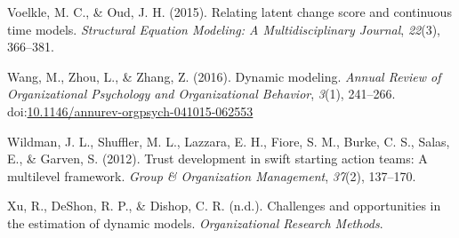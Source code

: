 \documentclass[english,,man]{apa6}
\theoremstyle{definition}
\theoremstyle{definition}
\theoremstyle{definition}
\theoremstyle{remark}
\begin{document}
\leavevmode\hypertarget{ref-voelkle2015relating}{}%
Voelkle, M. C., \& Oud, J. H. (2015). Relating latent change score and
continuous time models. \emph{Structural Equation Modeling: A
Multidisciplinary Journal}, \emph{22}(3), 366--381.

\leavevmode\hypertarget{ref-Wang2016}{}%
Wang, M., Zhou, L., \& Zhang, Z. (2016). Dynamic modeling. \emph{Annual
Review of Organizational Psychology and Organizational Behavior},
\emph{3}(1), 241--266.
doi:\href{https://doi.org/10.1146/annurev-orgpsych-041015-062553}{10.1146/annurev-orgpsych-041015-062553}

\leavevmode\hypertarget{ref-wildman2012trust}{}%
Wildman, J. L., Shuffler, M. L., Lazzara, E. H., Fiore, S. M., Burke, C.
S., Salas, E., \& Garven, S. (2012). Trust development in swift starting
action teams: A multilevel framework. \emph{Group \& Organization
Management}, \emph{37}(2), 137--170.

\leavevmode\hypertarget{ref-xu_deshon_dishop}{}%
Xu, R., DeShon, R. P., \& Dishop, C. R. (n.d.). Challenges and
opportunities in the estimation of dynamic models. \emph{Organizational
Research Methods}.
\end{document}
